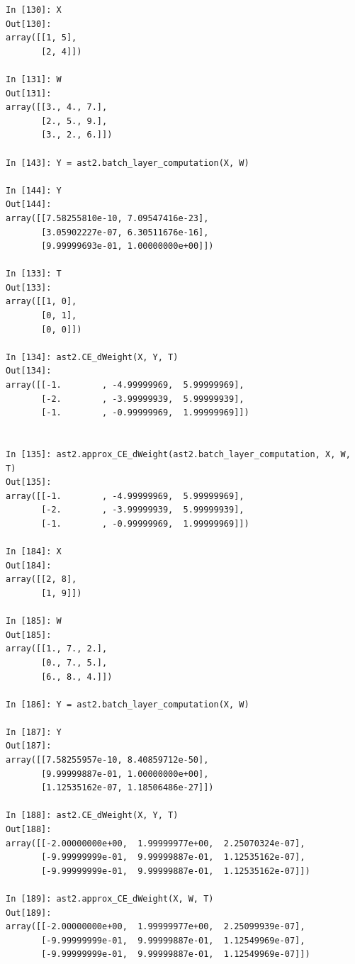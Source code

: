 \documentclass[12pt]{article}
\begin{document}
\begin{lstlisting}
In [130]: X
Out[130]: 
array([[1, 5],
       [2, 4]])

In [131]: W
Out[131]: 
array([[3., 4., 7.],
       [2., 5., 9.],
       [3., 2., 6.]])

In [143]: Y = ast2.batch_layer_computation(X, W)

In [144]: Y
Out[144]: 
array([[7.58255810e-10, 7.09547416e-23],
       [3.05902227e-07, 6.30511676e-16],
       [9.99999693e-01, 1.00000000e+00]])

In [133]: T
Out[133]: 
array([[1, 0],
       [0, 1],
       [0, 0]])

In [134]: ast2.CE_dWeight(X, Y, T)
Out[134]: 
array([[-1.        , -4.99999969,  5.99999969],
       [-2.        , -3.99999939,  5.99999939],
       [-1.        , -0.99999969,  1.99999969]])


In [135]: ast2.approx_CE_dWeight(ast2.batch_layer_computation, X, W, T)
Out[135]: 
array([[-1.        , -4.99999969,  5.99999969],
       [-2.        , -3.99999939,  5.99999939],
       [-1.        , -0.99999969,  1.99999969]])

In [184]: X
Out[184]: 
array([[2, 8],
       [1, 9]])

In [185]: W
Out[185]: 
array([[1., 7., 2.],
       [0., 7., 5.],
       [6., 8., 4.]])

In [186]: Y = ast2.batch_layer_computation(X, W)

In [187]: Y
Out[187]: 
array([[7.58255957e-10, 8.40859712e-50],
       [9.99999887e-01, 1.00000000e+00],
       [1.12535162e-07, 1.18506486e-27]])

In [188]: ast2.CE_dWeight(X, Y, T)
Out[188]: 
array([[-2.00000000e+00,  1.99999977e+00,  2.25070324e-07],
       [-9.99999999e-01,  9.99999887e-01,  1.12535162e-07],
       [-9.99999999e-01,  9.99999887e-01,  1.12535162e-07]])

In [189]: ast2.approx_CE_dWeight(X, W, T)
Out[189]: 
array([[-2.00000000e+00,  1.99999977e+00,  2.25099939e-07],
       [-9.99999999e-01,  9.99999887e-01,  1.12549969e-07],
       [-9.99999999e-01,  9.99999887e-01,  1.12549969e-07]])
\end{lstlisting}


\end{document}
